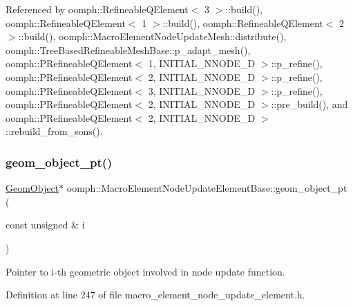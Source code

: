 Referenced by oomph\+::\+Refineable\+Q\+Element$<$ 3 $>$\+::build(), oomph\+::\+Refineable\+Q\+Element$<$ 1 $>$\+::build(), oomph\+::\+Refineable\+Q\+Element$<$ 2 $>$\+::build(), oomph\+::\+Macro\+Element\+Node\+Update\+Mesh\+::distribute(), oomph\+::\+Tree\+Based\+Refineable\+Mesh\+Base\+::p\+\_\+adapt\+\_\+mesh(), oomph\+::\+P\+Refineable\+Q\+Element$<$ 1, I\+N\+I\+T\+I\+A\+L\+\_\+\+N\+N\+O\+D\+E\+\_\+D $>$\+::p\+\_\+refine(), oomph\+::\+P\+Refineable\+Q\+Element$<$ 2, I\+N\+I\+T\+I\+A\+L\+\_\+\+N\+N\+O\+D\+E\+\_\+D $>$\+::p\+\_\+refine(), oomph\+::\+P\+Refineable\+Q\+Element$<$ 3, I\+N\+I\+T\+I\+A\+L\+\_\+\+N\+N\+O\+D\+E\+\_\+D $>$\+::p\+\_\+refine(), oomph\+::\+P\+Refineable\+Q\+Element$<$ 2, I\+N\+I\+T\+I\+A\+L\+\_\+\+N\+N\+O\+D\+E\+\_\+D $>$\+::pre\+\_\+build(), and oomph\+::\+P\+Refineable\+Q\+Element$<$ 2, I\+N\+I\+T\+I\+A\+L\+\_\+\+N\+N\+O\+D\+E\+\_\+D $>$\+::rebuild\+\_\+from\+\_\+sons().

\mbox{\label{classoomph_1_1MacroElementNodeUpdateElementBase_a6f9d2b5b09342d2acf235b595da071e3}} 
\subsubsection{\texorpdfstring{geom\+\_\+object\+\_\+pt()}{geom\_object\_pt()}\hspace{0.1cm}{\footnotesize\ttfamily [2/2]}}
{\footnotesize\ttfamily \hyperlink{classoomph_1_1GeomObject}{Geom\+Object}$\ast$ oomph\+::\+Macro\+Element\+Node\+Update\+Element\+Base\+::geom\+\_\+object\+\_\+pt (\begin{DoxyParamCaption}\item[{const unsigned \&}]{i }\end{DoxyParamCaption})\hspace{0.3cm}{\ttfamily [inline]}}



Pointer to i-\/th geometric object involved in node update function. 



Definition at line 247 of file macro\+\_\+element\+\_\+node\+\_\+update\+\_\+element.\+h.



